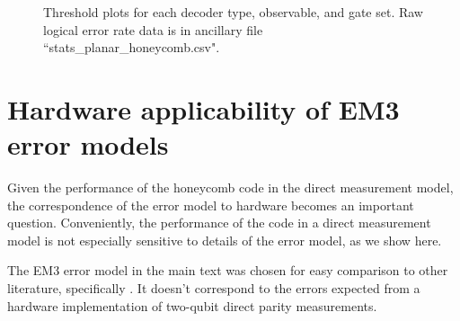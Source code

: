 \documentclass[onecolumn,unpublished,a4paper]{quantumarticle}
\theoremstyle{definition}
\theoremstyle{definition}
\theoremstyle{definition}
\begin{document}
\begin{figure}
    \centering
    \caption{
        Threshold plots for each decoder type, observable, and gate set.
        Raw logical error rate data is in ancillary file ``stats\_planar\_honeycomb.csv".
    }
    \label{fig:threshold_breakdown}
\end{figure}

\clearpage
\section{Hardware applicability of EM3 error models}
\label{app:hardware_em3}


Given the performance of the honeycomb code in the direct measurement model, the correspondence of the error model to hardware becomes an important question. Conveniently, the performance of the code in a direct measurement model is not especially sensitive to details of the error model, as we show here.

The EM3 error model in the main text was chosen for easy comparison to other literature, specifically \cite{chao2020optimization}. It doesn't correspond to the errors expected from a hardware implementation of two-qubit direct parity measurements. 
\end{document}
